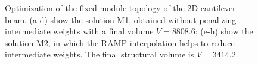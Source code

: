 \begin{figure}
    \hfill
    \hfill
    \hfill
    \caption{Optimization of the fixed module topology of the 2D cantilever beam. (a-d) show the solution M1, obtained without penalizing intermediate weights with a final volume $V = 8808.6$; (e-h) show the solution M2, in which the RAMP interpolation helps to reduce intermediate weights. The final structural volume is $V = 3414.2$.}
    \label{fig:06_fixed_module}
\end{figure}

